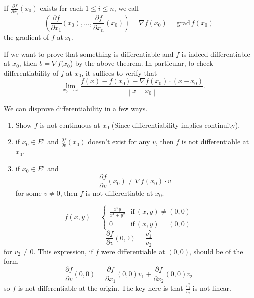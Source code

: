 \documentclass[11pt]{article}
\newcommand{\norm}[1]{\left\lVert #1 \right\rVert}
\newcommand{\ra}{\rightarrow}
\begin{document}
    \begin{definition}
        If $\frac{\partial f}{\partial x_i}(x_0)$ exists for each $1 \leq i \leq n$, we call \[(\frac{\partial f}{\partial x_1} (x_0), ..., \frac{\partial f }{\partial x_n} (x_0)) = \nabla f(x_0) = \text{grad} \ f(x_0)\]
        the gradient of $f$ at $x_0$. 
    \end{definition}
    \newpage
    \begin{remark}
        If we want to prove that something is differentiable and $f$ is indeed differentiable at $x_0$, then $b = \nabla f(x_0$) by the above theorem. In particular, to check differentiability of $f$ at $x_0$, it suffices to verify that 
        \[= \lim_{x_0 \ra x}\frac{f(x) - f(x_0) - \nabla f(x_0) \cdot (x - x_0)}{\norm{x - x_0}}.\]

        We can disprove differentiability in a few ways. 
        \begin{enumerate}[label = \roman*)]
            \item Show $f$ is not continuous at $x_0$ (Since differentiability implies continuity). 
            \item if $x_0 \in E^\circ$ and $\frac{\partial f}{\partial v}(x_0)$ doesn't exist for any $v$, then $f$ is not differentiable at $x_0$. 
            \item if $x_0 \in E^\circ$ and \[\frac{\partial f}{\partial v}(x_0) \neq \nabla f(x_0) \cdot v\]
            for some $v \neq 0$, then $f$ is not differentiable at $x_0$. 
        \end{enumerate}
    \end{remark}

    \begin{example}
        \[f(x,y) = 
    \begin{cases}
        \frac{x^2y}{x^4 + y^2} & \text{if} \ (x,y) \neq (0,0) \\
        0 & \text{if} \ (x,y) = (0,0)
    \end{cases}
    \]
    \[\frac{\partial f}{\partial v}(0,0) = \frac{v_1^2}{v_2}\]
    for $v_2 \neq 0$. This expression, if $f$ were differentiable at $(0,0)$, should be of the form
    \[\frac{\partial f}{\partial v}(0,0) = \frac{\partial f}{\partial x_1}(0,0)v_1 + \frac{\partial f}{\partial x_2}(0,0)v_2\]
    so $f$ is not differentiable at the origin. The key here is that $\frac{v_1^2}{v_2}$ is not linear. 
    \end{example}
\end{document}
